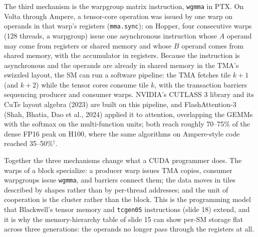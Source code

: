 \documentclass[11pt,letterpaper]{article}
\begin{document}
The third mechanism is the warpgroup matrix instruction, \texttt{wgmma} in PTX. On Volta through Ampere, a tensor-core operation was issued by one warp on operands in that warp's registers (\texttt{mma.sync}); on Hopper, four consecutive warps (128 threads, a warpgroup) issue one asynchronous instruction whose $A$ operand may come from registers or shared memory and whose $B$ operand comes from shared memory, with the accumulator in registers. Because the instruction is asynchronous and the operands are already in shared memory in the TMA's swizzled layout, the SM can run a software pipeline: the TMA fetches tile $k{+}1$ (and $k{+}2$) while the tensor cores consume tile $k$, with the transaction barriers sequencing producer and consumer warps. NVIDIA's CUTLASS 3 library and its CuTe layout algebra (2023) are built on this pipeline, and FlashAttention-3 (Shah, Bhatia, Dao et al., 2024) applied it to attention, overlapping the GEMMs with the softmax on the multi-function units; both reach roughly 70--75\% of the dense FP16 peak on H100, where the same algorithms on Ampere-style code reached 35--50\%$^\dagger$.

Together the three mechanisms change what a CUDA programmer does. The warps of a block specialize: a producer warp issues TMA copies, consumer warpgroups issue \texttt{wgmma}, and barriers connect them; the data moves in tiles described by shapes rather than by per-thread addresses; and the unit of cooperation is the cluster rather than the block. This is the programming model that Blackwell's tensor memory and \texttt{tcgen05} instructions (slide 18) extend, and it is why the memory-hierarchy table of slide 15 can show per-SM storage flat across three generations: the operands no longer pass through the registers at all.
\end{document}

